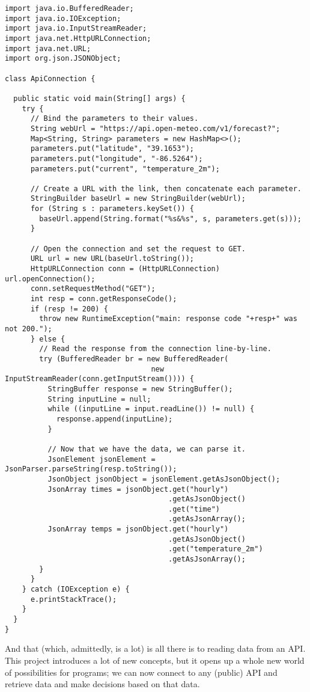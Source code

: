 \begin{cl}[]{}
\begin{lstlisting}[language=MyJava]
import java.io.BufferedReader;
import java.io.IOException;
import java.io.InputStreamReader;
import java.net.HttpURLConnection;
import java.net.URL;
import org.json.JSONObject;

class ApiConnection {

  public static void main(String[] args) {
    try {
      // Bind the parameters to their values.
      String webUrl = "https://api.open-meteo.com/v1/forecast?";
      Map<String, String> parameters = new HashMap<>();
      parameters.put("latitude", "39.1653");
      parameters.put("longitude", "-86.5264");
      parameters.put("current", "temperature_2m");

      // Create a URL with the link, then concatenate each parameter.
      StringBuilder baseUrl = new StringBuilder(webUrl);
      for (String s : parameters.keySet()) { 
        baseUrl.append(String.format("%s&%s", s, parameters.get(s))); 
      }
    
      // Open the connection and set the request to GET.
      URL url = new URL(baseUrl.toString());
      HttpURLConnection conn = (HttpURLConnection) url.openConnection();
      conn.setRequestMethod("GET");
      int resp = conn.getResponseCode();
      if (resp != 200) {
        throw new RuntimeException("main: response code "+resp+" was not 200.");
      } else {
        // Read the response from the connection line-by-line.
        try (BufferedReader br = new BufferedReader(
                                  new InputStreamReader(conn.getInputStream()))) {
          StringBuffer response = new StringBuffer();
          String inputLine = null;
          while ((inputLine = input.readLine()) != null) {
            response.append(inputLine); 
          }

          // Now that we have the data, we can parse it.
          JsonElement jsonElement = JsonParser.parseString(resp.toString());
          JsonObject jsonObject = jsonElement.getAsJsonObject();
          JsonArray times = jsonObject.get("hourly")
                                      .getAsJsonObject()
                                      .get("time")
                                      .getAsJsonArray();
          JsonArray temps = jsonObject.get("hourly")
                                      .getAsJsonObject()
                                      .get("temperature_2m")
                                      .getAsJsonArray();
        }
      }
    } catch (IOException e) {
      e.printStackTrace();
    }
  }
}
\end{lstlisting}
\end{cl}

And that (which, admittedly, is a lot) is all there is to reading data from an API. This project introduces a lot of new concepts, but it opens up a whole new world of possibilities for programs; we can now connect to any (public) API and retrieve data and make decisions based on that data.
